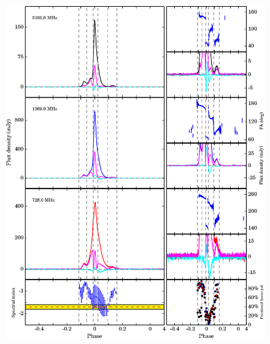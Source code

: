 \documentclass[useAMS,usenatbib]{mn2e}
\begin{document}
\begin{figure}
\begin{center}
\includegraphics[width=7 in]{1713.ps}
\end{center}
\end{figure}
\end{document}
